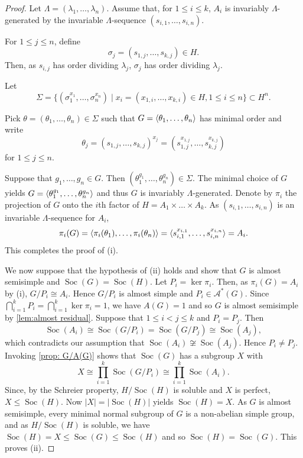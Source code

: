 \documentclass[12pt,a4paper]{amsart}
\DeclareMathOperator{\Soc}{Soc}
\DeclarePairedDelimiter{\gen}{\langle}{\rangle}
\begin{document}
\begin{proof} Let $\Lambda=(\lambda_1, \dots,\lambda_n)$.  Assume that, for $1\le i\le k$, $A_i$ is invariably $\Lambda$-generated by the invariable $\Lambda$-sequence $(s_{i,1}, \dots, s_{i,n})$.



For $1\le j \le n$, define $$\sigma_j=(s_{1,j}, \dots, s_{k,j}) \in H.$$ Then, as $s_{i,j}$ has order dividing $\lambda_j$,   $\sigma_j$ has order dividing $\lambda_j$.



Let $$ \Sigma = \{(\sigma_1^{x_1}, \dots,\sigma_n ^{x_n})\mid x_i=(x_{1,i}, \dots, x_{k,i}) \in H, 1\le i \le n\}\subset H^n.$$

Pick $\theta =(\theta_1, \dots, \theta_n)\in \Sigma$ such that $G=\gen{\theta_1,\dots,\theta_n}$ has minimal order and write $$\theta_j=  (s_{1,j}, \dots, s_{k,j})^{x_j}=(s_{1,j}^{x_{1,j}},\dots,s_{k,j}^{x_{k,j}})$$ for $1\le j \le n$.


Suppose that $g_1,\dots,g_n \in G$. Then $(\theta_1^{g_1},\dots, \theta_n^{g_n})\in \Sigma$. The minimal choice of $G$ yields $G=\gen{\theta_1^{g_1},\dots, \theta_n^{g_n}}$ and thus $G$ is invariably $\Lambda$-generated.
 Denote by $\pi_i$ the projection of $G$ onto the $i$th factor of $H=A_1 \times \dots \times A_k$. As    $(s_{i,1}, \dots, s_{i,n})$  is an invariable $\Lambda$-sequence for $A_i$,    $$\pi_i(G)=\gen{\pi_i(\theta_1), \dots, \pi_i(\theta_n)} =\gen{s_{i,1}^{x_{i,1}},\dots, s_{i,n}^{x_{i,n}}}=A_i.$$  This completes the proof of (i).

 We now suppose that the hypothesis of (ii) holds and show that $G$ is almost semisimple   and $\Soc(G)=\Soc(H)$.
Let $P_i=\ker \pi_i$. Then, as $\pi_i(G)=A_i$ by (i), $G/P_i\cong A_i$. Hence $G/P_i$ is almost simple and $P_i\in \mathcal A^*(G)$. Since $\bigcap_{i=1}^kP_i=\bigcap_{i=1}^k\ker\pi_i=1$, we have $A(G)=1$ and so $G$ is almost semisimple by \cref{lem:almost residual}.
 Suppose that $1\le i <j \le k$ and $P_i=P_j$.  Then $$\Soc(A_i)\cong \Soc(G/P_i)= \Soc(G/P_j)\cong \Soc(A_j),$$ which contradicts our assumption that $\Soc(A_i)\not\cong \Soc(A_j)$. Hence $P_i \ne P_j$.
Invoking \cref{prop: G/A(G)} shows that $\Soc(G)$ has a subgroup $X$ with $$X\cong \prod_{i=1}^k \Soc(G/P_i)\cong \prod_{i=1}^k \Soc(A_i).$$ Since, by the Schreier property, $H/\Soc(H)$ is soluble and $X$ is perfect, $X\le \Soc(H)$. Now $|X| = |\Soc(H)|$ yields $\Soc(H)=X$. As $G$ is almost semisimple, every minimal normal subgroup of $G$ is a non-abelian simple group, and as $H/\Soc(H)$ is soluble, we have $\Soc(H)=X \le \Soc(G) \le \Soc(H)$ and so $\Soc(H)=\Soc(G)$. This proves (ii).
\end{proof}
\end{document}
